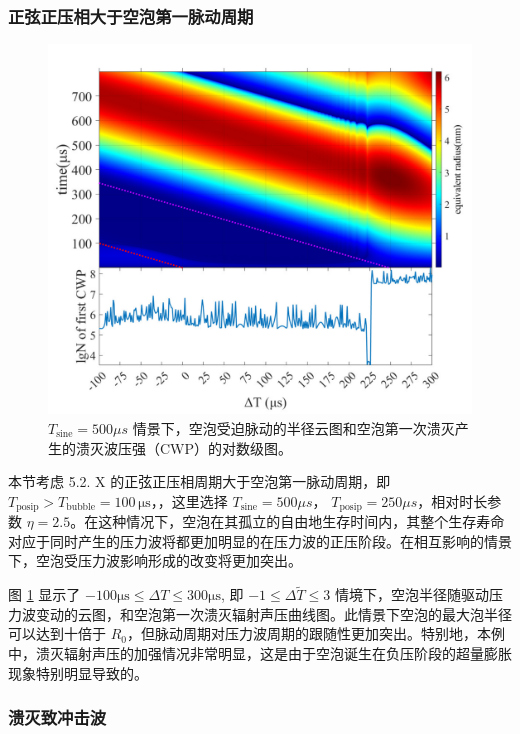 \medskip
\bigskip
\subsubsection{正弦正压相大于空泡第一脉动周期}


\begin{figure}[H]
  \centering
  \includegraphics[width=0.9\linewidth]{img/fig5.23-eps-converted-to.pdf}
  \caption{$T_\mathrm{sine}=500 \mu s$
情景下，空泡受迫脉动的半径云图和空泡第一次溃灭产生的溃灭波压强（CWP）的对数级图。}
  \label{fig:5.23}
\end{figure}

本节考虑 5.2. X 的正弦正压相周期大于空泡第一脉动周期，即
$T_\mathrm{posip}>T_\mathrm {bubble }=100\,\mathrm\mu \mathrm s$，，这里选择
$T_\mathrm{sine}=500 \mu s$，
$T_\mathrm{posip}=250\mu s$，相对时长参数
$\eta =2.5$。在这种情况下，空泡在其孤立的自由地生存时间内，其整个生存寿命对应于同时产生的压力波将都更加明显的在压力波的正压阶段。在相互影响的情景下，空泡受压力波影响形成的改变将更加突出。



图 \ref{fig:5.23} 显示了 $-100\mathrm{\mu s}\leq\Delta T\leq300\mathrm{\mu s}$,
即 $-1\leq\Delta \tilde{T} \leq3$
情境下，空泡半径随驱动压力波变动的云图，和空泡第一次溃灭辐射声压曲线图。此情景下空泡的最大泡半径可以达到十倍于
$R_0$，但脉动周期对压力波周期的跟随性更加突出。特别地，本例中，溃灭辐射声压的加强情况非常明显，这是由于空泡诞生在负压阶段的超量膨胀现象特别明显导致的。

\medskip
\bigskip
\subsubsection{
溃灭致冲击波}

